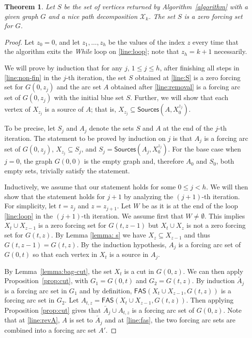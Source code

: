 \documentclass[12pt]{amsart}
\theoremstyle{plain}
\newtheorem{theorem}{Theorem}[section]
\theoremstyle{definition}
\def\X{\mathcal X}
\renewcommand{\subset}{\subseteq}
\newcommand{\sources}{\mathsf{Sources}}
\newcommand{\fas}{\mathsf{FAS}}
\begin{document}
\begin{theorem}\label{thm: proof of correctness}
Let $S$ be the set of vertices
returned by Algorithm~\ref{algorithm} with a given graph $G$ and a nice path decomposition $\X_k$. 
The set $S$ is a zero forcing set for $G$. 
\end{theorem}
\begin{proof}
Let $z_0=0$, and let $z_1,\dots, z_h$ be the values of the index $z$ every time that the algorithm exits the {\em While} loop on \ref{line:loop}; note that $z_h=k+1$ necessarily. 

We will prove by induction that for any $j$, $1\leq j\leq h$, after finishing all steps in \ref{line:non-fin} in the $j$-th iteration, the set $S$ obtained at \ref{line:S} is a zero forcing set for $G(0, z_j)$ and the arc set $A$ obtained after \ref{line:removal} is a forcing arc set of $G(0,z_j)$ with the initial blue set $S$.
Further, we will show that each vertex of $X_{z_{j}}$ is a source of $A$; that is, $X_{z_j}\subset \sources(A, X_0^{z_j})$. 


To be precise, let $S_j$ and $A_j$ denote the sets $S$ and $A$ at the end of the $j$-th iteration. 
The statement to be proved by induction on $j$ is that $A_j$ is a forcing arc set of $G(0,z_j)$, $X_{z_j}\subseteq S_j$, and $S_j=\sources(A_j,X_0^{z_j})$. For the base case when $j=0$, the graph $G(0, 0)$ is the empty graph and, therefore $A_0$ and $S_0$, both empty sets, trivially satisfy the statement.

Inductively, we assume that our statement holds for some $0\leq j<h$. We will then show that the statement holds for $j+1$ by analyzing the $(j+1)$-th iteration. For simplicity, let $t=z_j$ and $z=z_{j+1}$. Let $W$ be as it is at the end of the loop \ref{line:loop} in the $(j+1)$-th iteration. We assume first that $W\neq \emptyset$.
This implies $X_t\cup X_{z-1}$ is a zero forcing set for $G(t, z-1)$ but $X_t\cup X_z$ is not a zero forcing set for $G(t,z)$. 
 By Lemma \ref{lemma: s} we have $X_{z}\subset X_{z-1}$ and thus $G(t,z-1)=G(t,z)$. By the induction hypothesis, $A_j$ is a forcing arc set of $G(0,t)$ so that each vertex in $X_t$ is a source in $A_j$. 

By Lemma~\ref{lemma:bag-cut}, the set $X_t$ is a cut in $G(0,z)$. We can then apply Proposition~\ref{prop:cut}, with $G_1=G(0,t)$ and $G_2=G(t,z)$. By induction $\overleftarrow{A_j}$ is a forcing arc set in $G_1$ and by definition, $\fas(X_t\cup X_{z-1},G(t,z))$ is a forcing arc set in $G_2$. Let  $A_{t,z}=\fas(X_t\cup X_{z-1},G(t,z))$. Then applying Proposition \ref{prop:cut} gives that $\overleftarrow{A_j}\cup A_{t,z}$ is a forcing arc set of $G(0,z)$. Note that at \ref{line:revA}, $A$ is set to $\overleftarrow{A_j}$ and at \ref{line:fas}, the two forcing arc sets are combined into a forcing arc set $A'$. 


\end{proof}
\end{document}
